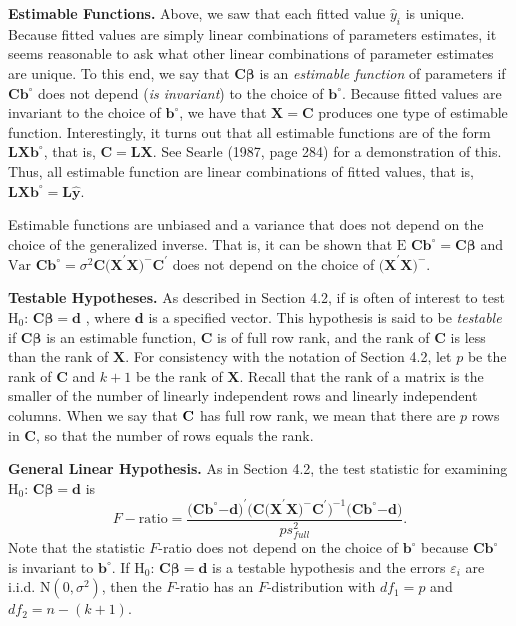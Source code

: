 \textbf{Estimable Functions.} Above, we saw that each fitted value $\hat{y}%
_i$ is unique. Because fitted values are simply linear combinations
of parameters estimates, it seems reasonable to ask what other
linear
combinations of parameter estimates are unique. To this end, we say that $%
\mathbf{C \boldsymbol \beta }$ is an \textit{estimable function} of parameters if $%
\mathbf{Cb}^{\circ }$ does not depend (\emph{is invariant}) to the
choice of $\mathbf{b}^{\circ }$. Because fitted values are invariant
to the choice of $\mathbf{b}^{\circ }$, we have that
$\mathbf{X}=\mathbf{C}$ produces one type of estimable function.
Interestingly, it turns out that all estimable functions are of the
form $\mathbf{LXb}^{\circ }$, that is, $\mathbf{C}=\mathbf{LX}$. See
Searle (1987, page 284) for a demonstration of this. Thus, all
estimable
function are linear combinations of fitted values, that is, $\mathbf{LXb}%
^{\circ }=\mathbf{L\hat{y}}$.

Estimable functions are unbiased and a variance that does not depend
on the choice of the generalized inverse. That is, it can be shown
that $ \text{E }\mathbf{Cb}^{\circ }=\mathbf{C \boldsymbol
\beta}$ and $ \text{Var }\mathbf{Cb}^{\circ }=\sigma ^{2}\mathbf{C(X}^{\prime}\mathbf{X)}%
^{-}\mathbf{C}^{\prime}$ does not depend on the choice of $\mathbf{(X}%
^{\prime}\mathbf{X)}^{-}.$

\textbf{Testable Hypotheses.} As described in Section
4.2, if is often of interest to test H$_0$: $\mathbf{C \boldsymbol \beta }=\mathbf{d}$%
, where $\mathbf{d}$ is a specified vector. This hypothesis is said
to be \textit{testable} if $\mathbf{C \boldsymbol \beta }$ is an
estimable function, $\mathbf{C} $ is of full row rank, and the rank
of $\mathbf{C}$ is less than the rank of $\mathbf{X}$. For
consistency with the notation of Section 4.2, let $p$ be the rank of
$\mathbf{C}$ and $k+1$ be the rank of $\mathbf{X}$. Recall that the
rank of a matrix is the smaller of the number of linearly
independent rows and linearly independent columns. When we say that $\mathbf{%
C}$ has full row rank, we mean that there are $p$ rows in
$\mathbf{C}$, so that the number of rows equals the rank.

\textbf{General Linear Hypothesis.} As in Section 4.2, the test
statistic for examining H$_0$: $\mathbf{C \boldsymbol
\beta}=\mathbf{d}$ is
\begin{equation*}
F-\text{ratio}=\frac{\mathbf{(Cb}^{\circ }\mathbf{-d)}^{\prime}\mathbf{(C(X}%
^{\prime}\mathbf{X)}^{-}\mathbf{C}^{\prime}\mathbf{)}^{-1}\mathbf{(Cb}%
^{\circ }\mathbf{-d)}}{ps_{full}^{2}}.
\end{equation*}
Note that the statistic $F$-ratio does not depend on the choice of
$\mathbf{b}^{\circ}$ because $\mathbf{C b}^{\circ}$ is invariant to
$\mathbf{b}^{\circ}$. If H$_0$: $\mathbf{C \boldsymbol \beta
}=\mathbf{d}$ is a testable hypothesis and the errors
$\varepsilon_i$ are i.i.d. N$(0,\sigma ^{2})$, then the $F$-ratio
has an $F$-distribution with $df_1=p$ and $df_2=n-(k+1)$.

